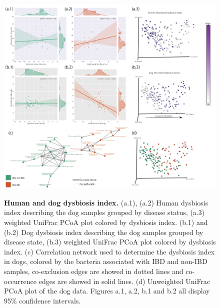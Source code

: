 \begin{figure}[htbp]
\includegraphics[width=1\columnwidth]{dogs-figures/figure-2}
\label{dogs_fig2}
\caption[Human and dog dysbiosis index.]{\textbf{Human and dog dysbiosis index.} (a.1), (a.2) Human dysbiosis index describing the dog samples grouped by disease status, (a.3) weighted UniFrac PCoA plot colored by dysbiosis index. (b.1) and (b.2) Dog dysbiosis index describing the dog samples grouped by disease state, (b.3) weighted UniFrac PCoA plot colored by dysbiosis index. (c) Correlation network used to determine the dysbiosis index in dogs, colored by the bacteria associated with IBD and non-IBD samples, co-exclusion edges are showed in dotted lines and co-occurrence edges are showed in solid lines. (d) Unweighted UniFrac PCoA plot of the dog data. Figures a.1, a.2, b.1 and b.2 all display 95\% confidence intervals.}
\end{figure}

